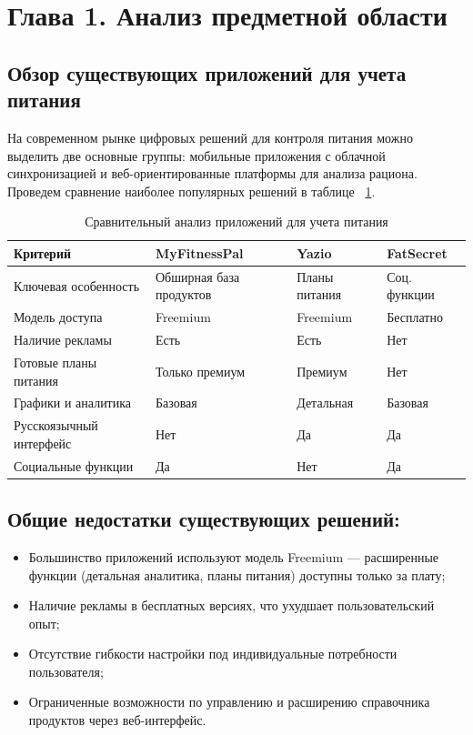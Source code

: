 \section*{Глава 1. Анализ предметной области}

\subsection{Обзор существующих приложений для учета питания}

На современном рынке цифровых решений для контроля питания можно выделить две основные группы: мобильные приложения с облачной синхронизацией и веб-ориентированные платформы для анализа рациона. Проведем сравнение наиболее популярных решений в таблице ~\ref{tab:competitors}.

\begin{table}[ht!]
	\centering
	\caption{Сравнительный анализ приложений для учета питания}
	\label{tab:competitors}
	{\small
\begin{tabular}{|l|l|l|l|}
	\hline
	\textbf{Критерий} & \textbf{MyFitnessPal} & \textbf{Yazio} & \textbf{FatSecret} \\ \hline
	Ключевая особенность & Обширная база продуктов & Планы питания & Соц. функции \\ \hline
	Модель доступа & Freemium & Freemium & Бесплатно \\ \hline
	Наличие рекламы & Есть & Есть & Нет \\ \hline
	Готовые планы питания & Только премиум & Премиум & Нет \\ \hline
	Графики и аналитика & Базовая & Детальная & Базовая \\ \hline
	Русскоязычный интерфейс & Нет & Да & Да \\ \hline
	Социальные функции & Да & Нет & Да \\ \hline
\end{tabular}
}
\end{table}

\subsection*{Общие недостатки существующих решений:}
\begin{itemize}
	\item Большинство приложений используют модель Freemium — расширенные функции (детальная аналитика, планы питания) доступны только за плату;
	\item Наличие рекламы в бесплатных версиях, что ухудшает пользовательский опыт;
	\item Отсутствие гибкости настройки под индивидуальные потребности пользователя;
	\item Ограниченные возможности по управлению и расширению справочника продуктов через веб-интерфейс.
\end{itemize}

